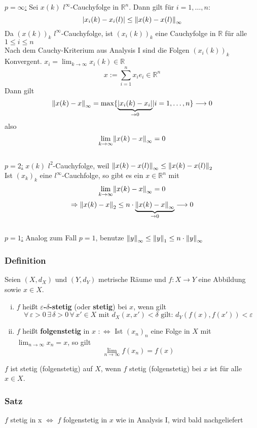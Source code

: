 \underline{$p=\infty$:} Sei $x(k)$ $l^{\infty}$-Cauchyfolge in $\mathbb{R}^n$. Dann gilt für $i=1,\dots,n$:
\[
	\abs{x_i(k)-x_i(l)} \leq \norm{x(k)-x(l)}_{\infty}
\]
Da $(x(k))_k$ $l^{\infty}$-Cauchyfolge, ist $(x_i(k))_k$ eine Cauchyfolge in $\mathbb{R}$ für alle $1\leq i \leq n$ \\
Nach dem Cauchy-Kriterium aus Analysis I sind die Folgen $(x_i(k))_k$ Konvergent. $x_i=\lim_{k \to \infty}x_i(k) \in \mathbb{R}$
\[
	x := \sum_{i=1}^{n}x_ie_i \in \mathbb{R}^n
\] 
Dann gilt 
\[
	\norm{x(k)-x}_{\infty} = \max\{ \underset{\to 0}{\underbrace{\abs{x_i(k)-x_i}}} | i=1,\dots,n \} \longrightarrow 0
\]
also
\[
	\lim_{k \to \infty}\norm{x(k)-x}_{\infty} = 0
\]
\\
\underline{$p=2$:}
$x(k)$ $l^2$-Cauchyfolge, weil $\norm{x(k)-x(l)}_{\infty} \leq \norm{x(k)-x(l)}_2$ \\
Ist $(x_k)_k$ eine $l^{\infty}$-Cauchfolge, so gibt es ein $x \in \mathbb{R}^n$ mit 
\[
	\lim_{k \to \infty}\norm{x(k)-x}_{\infty}=0
\]
\[
	\Rightarrow \norm{x(k)-x}_2 \leq n \cdot \underset{\to 0}{\underbrace{\norm{x(k)-x}_{\infty}}} \longrightarrow 0
\] 
\\
\underline{$p=1$:} Analog zum Fall $p=1$, benutze $\norm{y}_{\infty} \leq \norm{y}_1 \leq n \cdot \norm{y}_{\infty}$ 
\bewende	
\subsubsection[Stetigkeit]{Definition} %
\label{ssub:definition}
Seien $(X,d_X)$ und $(Y,d_Y)$ metrische Räume und $f:X \to Y$ eine Abbildung sowie $x \in X$.
\begin{enumerate}[(i)]
	\item $f$ heißt {\bfseries $\varepsilon$-$\delta$-stetig} (oder {\bfseries stetig}) bei $x$, wenn gilt
	\[
		\forall\, \varepsilon >0 \, \exists \, \delta>0 \, \forall\, x' \in X \text{ mit } d_X(x,x')< \delta \text{ gilt: } d_Y(f(x),f(x'))<\varepsilon 
	\]
	\item $f$ heißt {\bfseries folgenstetig} in $x$ $:\Leftrightarrow$ Ist $(x_n)_n $ eine Folge in $X$ mit $\lim_{n \to \infty}x_n=x$, so gilt
	\[
		\lim_{n \to \infty}f(x_n)=f(x)
	\]
\end{enumerate}
$f$ ist stetig (folgenstetig) auf $X$, wenn $f$ stetig (folgenstetig) bei $x$ ist für alle $x \in X$.

\subsubsection{Satz} %
\label{ssub:satz}
$f$ stetig in x $\Leftrightarrow$ $f$ folgenstetig in $x$
 wie in Analysis I, wird bald nachgeliefert

